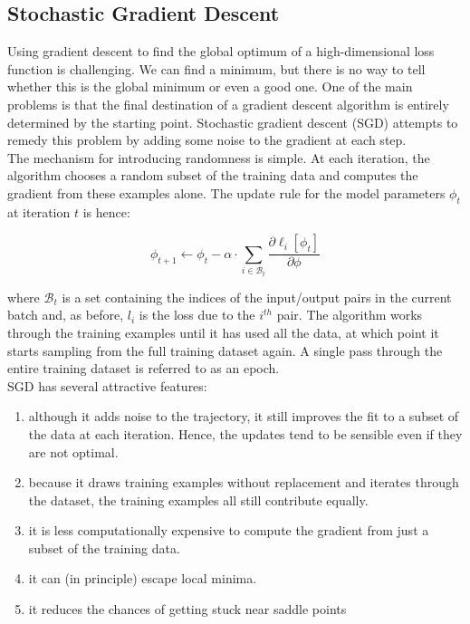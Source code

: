 \subsection{Stochastic Gradient Descent}
Using gradient descent to find the global optimum of a high-dimensional loss function is challenging. We can find a minimum, but there is no way to tell whether this is the global minimum or even a good one. One of the main problems is that the final destination of a gradient descent algorithm is entirely determined by the starting point. Stochastic gradient descent (SGD) attempts to remedy this problem by adding some noise to the gradient at each step. \\
The mechanism for introducing randomness is simple. At each iteration, the algorithm chooses a random subset of the training data and computes the gradient from these examples alone. The update rule for the model parameters $\phi_{t}$ at iteration $t$ is hence:

\begin{equation}
    \phi_{t+1} \longleftarrow \phi_{t}-\alpha \cdot \sum_{i \in \mathcal{B}_{t}} \frac{\partial \ell_{i}\left[\phi_{t}\right]}{\partial \phi}
\end{equation}

\noindent where $\mathcal{B}_{t}$ is a set containing the indices of the input/output pairs in the current batch and, as before, $l_{i}$ is the loss due to the $i^{th}$ pair. The algorithm works through the training examples until it has used all the data, at which point it starts sampling from the full training dataset again. A single pass through the entire training dataset is referred to as an epoch. \\
SGD has several attractive features:
\begin{enumerate}
    \item although it adds noise to the trajectory, it still improves the fit to a subset of the data at each iteration. Hence, the updates tend to be sensible even if they are not optimal.
    \item because it draws training examples without replacement and iterates through the dataset, the training examples all still contribute equally.
    \item it is less computationally expensive to compute the gradient from just a subset of the training data.
    \item it can (in principle) escape local minima.
    \item it reduces the chances of getting stuck near saddle points
\end{enumerate}


